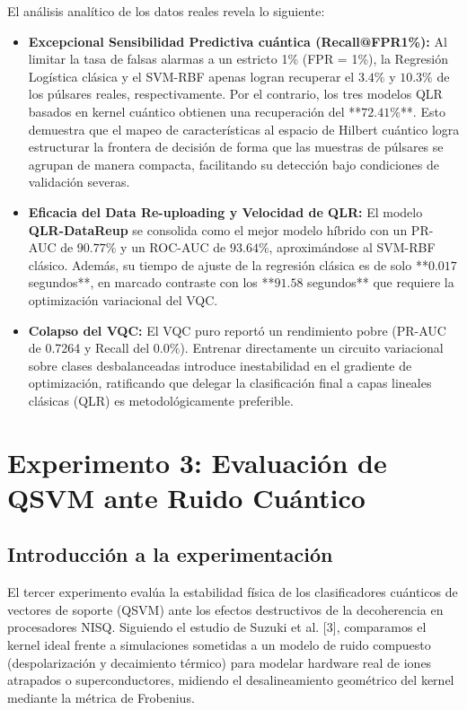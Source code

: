 \documentclass[12pt,oneside]{report}
\begin{document}
El análisis analítico de los datos reales revela lo siguiente:
\begin{itemize}
    \item \textbf{Excepcional Sensibilidad Predictiva cuántica (Recall@FPR1\%):} Al limitar la tasa de falsas alarmas a un estricto 1\% (FPR = 1\%), la Regresión Logística clásica y el SVM-RBF apenas logran recuperar el $3.4\%$ y $10.3\%$ de los púlsares reales, respectivamente. Por el contrario, los tres modelos QLR basados en kernel cuántico obtienen una recuperación del **$72.41\%$**. Esto demuestra que el mapeo de características al espacio de Hilbert cuántico logra estructurar la frontera de decisión de forma que las muestras de púlsares se agrupan de manera compacta, facilitando su detección bajo condiciones de validación severas.
    \item \textbf{Eficacia del Data Re-uploading y Velocidad de QLR:} El modelo \textbf{QLR-DataReup} se consolida como el mejor modelo híbrido con un PR-AUC de $90.77\%$ y un ROC-AUC de $93.64\%$, aproximándose al SVM-RBF clásico. Además, su tiempo de ajuste de la regresión clásica es de solo **$0.017$ segundos**, en marcado contraste con los **$91.58$ segundos** que requiere la optimización variacional del VQC.
    \item \textbf{Colapso del VQC:} El VQC puro reportó un rendimiento pobre (PR-AUC de 0.7264 y Recall del $0.0\%$). Entrenar directamente un circuito variacional sobre clases desbalanceadas introduce inestabilidad en el gradiente de optimización, ratificando que delegar la clasificación final a capas lineales clásicas (QLR) es metodológicamente preferible.
\end{itemize}

\section{Experimento 3: Evaluaci\'on de QSVM ante Ruido Cu\'antico}

\subsection{Introducción a la experimentación}
El tercer experimento evalúa la estabilidad física de los clasificadores cuánticos de vectores de soporte (QSVM) ante los efectos destructivos de la decoherencia en procesadores NISQ. Siguiendo el estudio de Suzuki et al. [3], comparamos el kernel ideal frente a simulaciones sometidas a un modelo de ruido compuesto (despolarización y decaimiento térmico) para modelar hardware real de iones atrapados o superconductores, midiendo el desalineamiento geométrico del kernel mediante la métrica de Frobenius.
\end{document}
